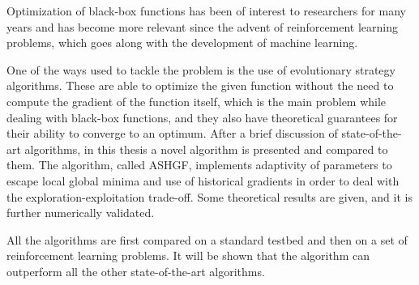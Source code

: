 
Optimization of black-box functions has been of interest to researchers for many years and has become more relevant since the advent of reinforcement learning problems, which goes along with the development of machine learning.

One of the ways used to tackle the problem is the use of evolutionary strategy algorithms. These are able to  optimize the given function without the need to compute the gradient of the function itself, which is the main problem while dealing with black-box functions, and they also have theoretical guarantees for their ability to converge to an optimum. After a brief discussion of state-of-the-art algorithms, in this thesis a novel algorithm is presented and compared to them. The algorithm, called ASHGF, implements adaptivity of parameters to escape local global minima and use of historical gradients in order to deal with the exploration-exploitation trade-off. Some theoretical results are given, and it is further numerically validated.

All the algorithms are first compared on a standard testbed and then on a set of reinforcement learning problems. It will be shown that the algorithm can outperform all the other state-of-the-art algorithms.
